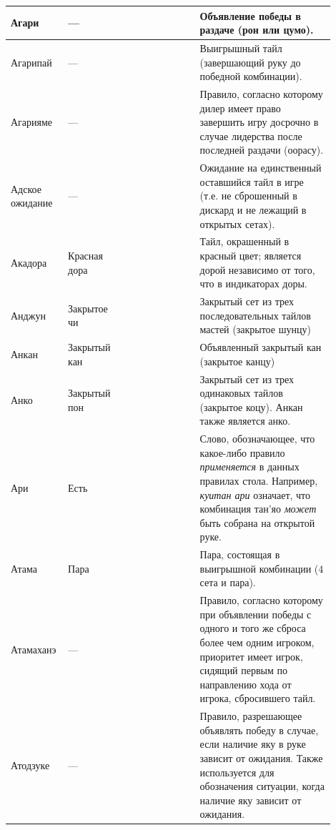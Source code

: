\begin{tabularx}{\linewidth}{L{0.14\linewidth}L{0.13\linewidth}L{0.1\linewidth}L{0.13\linewidth}L{0.4\linewidth}}
	Агари & --- &  &  & Объявление победы в раздаче (рон или цумо). \\
	\midrule
	Агарипай & --- &  &  & Выигрышный тайл (завершающий руку до победной комбинации). \\
	\midrule
	Агарияме & --- &  &  & Правило, согласно которому дилер имеет право завершить игру досрочно в случае лидерства после последней раздачи (оорасу). \\
	\midrule
	Адское ожидание & --- &  &  & Ожидание на единственный оставшийся тайл в игре (т.е. не сброшенный в дискард и не лежащий в открытых сетах). \\
	\midrule
	Акадора & Красная дора &  &  & Тайл, окрашенный в красный цвет; является дорой независимо от того, что в индикаторах доры. \\
	\midrule
	Анджун & Закрытое чи &  &  & Закрытый сет из трех последовательных тайлов мастей (закрытое шунцу) \\
	\midrule
	Анкан & Закрытый кан &  &  & Объявленный закрытый кан (закрытое канцу) \\
	\midrule
	Анко & Закрытый пон &  &  & Закрытый сет из трех одинаковых тайлов (закрытое коцу). Анкан также является анко. \\
	\midrule
	Ари & Есть &  &  & Слово, обозначающее, что какое-либо правило \textit{применяется} в данных правилах стола. Например, \textit{куитан ари} означает, что комбинация тан'яо \textit{может} быть собрана на открытой руке. \\
	\midrule
	Атама & Пара &  &  & Пара, состоящая в выигрышной комбинации (4 сета и пара). \\
	\midrule
	Атамаханэ & --- &  &  & Правило, согласно которому при объявлении победы с одного и того же сброса более чем одним игроком, приоритет имеет игрок, сидящий первым по направлению хода от игрока, сбросившего тайл. \\
	\midrule
	Атодзуке & --- &  &  & Правило, разрешающее объявлять победу в случае, если наличие яку в руке зависит от ожидания. Также используется для обозначения ситуации, когда наличие яку зависит от ожидания. \\

\end{tabularx}
